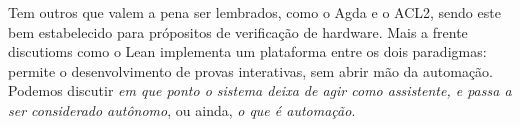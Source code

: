 Tem outros que valem a pena ser lembrados, como o Agda e o ACL2, sendo este bem estabelecido para própositos de verificação de hardware. Mais a frente discutioms como o Lean implementa um plataforma entre os dois paradigmas: permite o desenvolvimento de provas interativas, sem abrir mão da automação.
Podemos discutir \textit{em que ponto o sistema deixa de agir como assistente, e passa a ser considerado autônomo}, ou ainda, \textit{o que é automação}.



